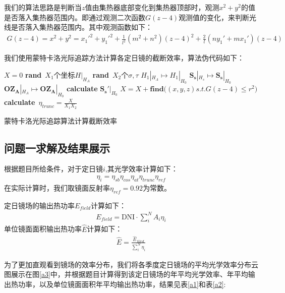 \documentclass[withoutpreface,bwprint]{cumcmthesis} %
\begin{document}
我们的算法思路是判断当$z$值由集热器底部变化到集热器顶部时，观测$x^2+y^2$的值是否落入集热器范围内。即通过观测二次函数$G(z-4)$观测值的变化，来判断光线是否落入集热器范围内。其中观测函数如下：
\begin{eqnarray}
G(z-4)=x^2+y^2=x_1'^2+y_1'^2+\frac{1}{l^2}(m^2+n^2)(z-4)^2+\frac{2}{l}(ny_1'+mx_1')(z-4)
\end{eqnarray}

我们使用蒙特卡洛光际追踪方法计算各定日镜的截断效率，算法伪代码如下：

\begin{algorithm}[H]
\normalem
  \SetAlgoLined
 
  
  {$X=0$ \;
  \textbf{rand}\ $X_1$个坐标$H|_{H_A}$ \;
  \textbf{rand}\ $X_2$个$\sigma,\tau$ \;
   {
    $H_1|_{H_A}\longmapsto H_1|_{H_0}$ \;
    $\mathbf{S_s}|_{H_s}\longmapsto \mathbf{S_s}|_{H_0}$ \;
    $\mathbf{OZ_A}|_{H_A}\longmapsto \mathbf{OZ_A}|_{H_0}$ \;
    \textbf{calculate} $\mathbf{S_s'}|_{H_0}$ \;
    $X=X+\textbf{find(}(x,y,z)s.t.G(z-4)\le r^2\textbf{)}$ \;
   }
   \textbf{calculate}\ $\eta_{trunc}=\frac{X}{X_1X_2}$ \;
  }  
  \caption{蒙特卡洛光际追踪算法计算截断效率}
 \end{algorithm}
\subsection{问题一求解及结果展示}
根据题目所给条件，对于定日镜$i$,其光学效率计算如下：
\begin{eqnarray}
\eta_i=\eta_{sb}\eta_{cos}\eta_{at}\eta_{trunc}\eta_{ref}
\end{eqnarray}
在实际计算时，我们取镜面反射率$\eta_{ref}=0.92$为常数。

定日镜场的输出热功率$E_{field}$计算如下：
\begin{eqnarray}
E_{field}=\text{DNI}\cdot \sum_i^NA_i\eta_i
\end{eqnarray}
单位镜面面积输出热功率$\hat{E}$计算如下：
\begin{eqnarray}
\hat{E}=\frac{\hat{E}_{filed}}{\sum\limits_i^N\eta_i}
\end{eqnarray}

为了更加直观看到镜场的效率分布，我们将各季度定日镜场的平均光学效率分布云图展示在图\ref{a3}中，并根据题目计算得到该定日镜场的年平均光学效率、年平均输出热功率，以及单位镜面面积年平均输出热功率，结果见表\ref{a1}和表\ref{a2}:
\end{document}
